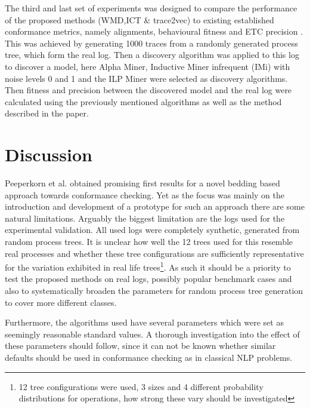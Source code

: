\documentclass[runningheads]{template/llncs}
\begin{document}
The third and last set of experiments was designed to compare the performance of the proposed methods (WMD,ICT \& trace2vec) to existing established conformance metrics, namely alignments, behavioural fitness \cite{GMVB09} and ETC precision \cite{MuCa10}.
This was achieved by generating 1000 traces from a randomly generated process tree, which form the real log.
Then a discovery algorithm was applied to this log to discover a model, here Alpha Miner, Inductive Miner infrequent (IMi) with noise levels 0 and 1 and the ILP Miner were selected as discovery algorithms.
Then fitness and precision between the discovered model and the real log were calculated using the previously mentioned algorithms as well as the method described in the paper.

\section{Discussion}

Peeperkorn et al. obtained promising first results for a novel bedding based approach towards conformance checking.
Yet as the focus was mainly on the introduction and development of a prototype for such an approach there are some natural limitations.
Arguably the biggest limitation are the logs used for the experimental validation.
All used logs were completely synthetic, generated from random process trees.
It is unclear how well the 12 trees used for this resemble real processes and whether these tree configurations are sufficiently representative for the variation exhibited in real life trees\footnote{12 tree configurations were used, 3 sizes and 4 different probability distributions for operations, how strong these vary should be investigated}.
As such it should be a priority to test the proposed methods on real logs, possibly popular benchmark cases and also to systematically broaden the parameters for random process tree generation to cover more different classes.


Furthermore, the algorithms used have several parameters which were set as seemingly reasonable standard values.
A thorough investigation into the effect of these parameters should follow, since it can not be known whether similar defaults should be used in conformance checking  as in classical NLP problems.
\end{document}
